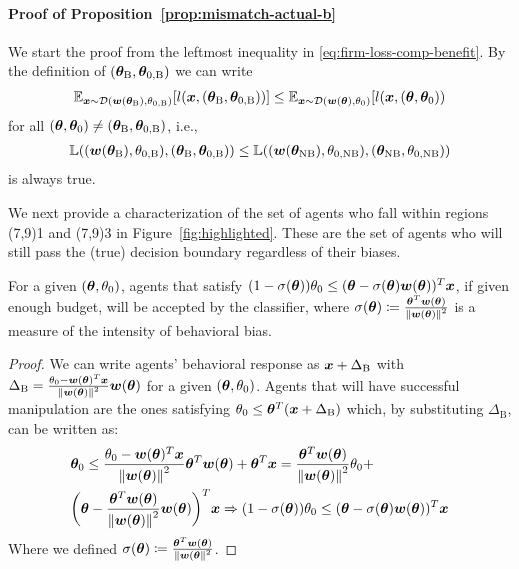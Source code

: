 \paragraph{Proof of Proposition~\ref{prop:mismatch-actual-b}}
We start the proof from the leftmost inequality in \eqref{eq:firm-loss-comp-benefit}. By the definition of $({\bm{\theta}}_\text{B}, {\bm{\theta}}_{0, \text{B}})$ we can write 
\begin{align*}
    \mathbb{E}_{{\bm{x}}\sim\mathcal{D}({\bm{w}}({\bm{\theta}}_\text{B}), \theta_{0, \text{B}})}[l({\bm{x}}, ({\bm{\theta}}_\text{B}, {\bm{\theta}}_{0, \text{B}}))]\le \mathbb{E}_{{\bm{x}}\sim\mathcal{D}({\bm{w}}({\bm{\theta}}), \theta_{0})}[l({\bm{x}}, ({\bm{\theta}}, {\bm{\theta}}_0))    
\end{align*}
for all $({\bm{\theta}}, {\bm{\theta}}_0)\neq ({\bm{\theta}}_\text{B}, {\bm{\theta}}_{0, \text{B}})$, i.e.,
\begin{align*}
    {\mathbb{L}}(({\bm{w}}({\bm{\theta}}_\text{B}), \theta_{0, \text{B}}), ({\bm{\theta}}_\text{B}, {\bm{\theta}}_{0, \text{B}}))\le {\mathbb{L}}(({\bm{w}}({\bm{\theta}}_\text{NB}), \theta_{0, \text{NB}}), ({\bm{\theta}}_\text{NB}, \theta_{0, \text{NB}}))
\end{align*}
is always true. 

We next provide a characterization of the set of agents who fall within regions \framebox(7,9){1} and \framebox(7,9){3} in Figure~\ref{fig:highlighted}. These are the set of agents who will still pass the (true) decision boundary regardless of their biases. 
\begin{lemma}\label{lemma:H}
     For a given $({\bm{\theta}}, \theta_0)$, agents that satisfy $(1-\sigma({\bm{\theta}}))\theta_0\le({\bm{\theta}}-\sigma({\bm{\theta}}){\bm{w}}({\bm{\theta}}))^T{\bm{x}}$, if given enough budget, will be accepted by the classifier, where $\sigma({\bm{\theta}}) \coloneqq \frac{{\bm{\theta}}^T{\bm{w}}({\bm{\theta}})}{\norm{{\bm{w}}({\bm{\theta}})}^2}$ is a measure of the intensity of behavioral bias. 
\end{lemma}
\begin{proof}
    We can write agents' behavioral response as ${\bm{x}}+\Delta_\text{B}$ with $\Delta_\text{B}=\frac{\theta_0-{\bm{w}}({\bm{\theta}})^T{\bm{x}}}{\norm{{\bm{w}}({\bm{\theta}})}^2}{\bm{w}}({\bm{\theta}})$ for a given $({\bm{\theta}}, \theta_0)$. Agents that will have successful manipulation are the ones satisfying $\theta_0\le {\bm{\theta}}^T({\bm{x}}+\Delta_\text{B})$ which, by substituting $\Delta_\text{B}$, can be written as:
\begin{align}
    &{\bm{\theta}}_0\le \frac{\theta_0-{\bm{w}}({\bm{\theta}})^T{\bm{x}}}{\norm{{\bm{w}}({\bm{\theta}})}^2}{\bm{\theta}}^T{\bm{w}}({\bm{\theta}})+{\bm{\theta}}^T{\bm{x}} = \frac{{\bm{\theta}}^T{\bm{w}}({\bm{\theta}})}{\norm{{\bm{w}}({\bm{\theta}})}^2}\theta_0+\notag\\
    &\bigg( {\bm{\theta}} - \frac{{\bm{\theta}}^T{\bm{w}}({\bm{\theta}})}{\norm{{\bm{w}}({\bm{\theta}})}^2} {\bm{w}}({\bm{\theta}}) \bigg)^T {\bm{x}} \Rightarrow(1-\sigma({\bm{\theta}}))\theta_0 \le ({\bm{\theta}}-\sigma({\bm{\theta}}){\bm{w}}({\bm{\theta}}))^T{\bm{x}}
\end{align}
    Where we defined $\sigma({\bm{\theta}})\coloneqq\frac{{\bm{\theta}}^T{\bm{w}}({\bm{\theta}})}{\norm{{\bm{w}}({\bm{\theta}}}^2}$.
\end{proof}


